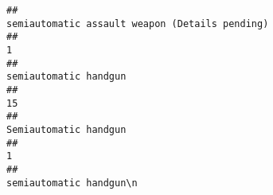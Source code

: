 \documentclass[
]{article}
\begin{document}
\begin{verbatim}
##                                                                                                                                                                                                                                                                                                                                                        semiautomatic assault weapon (Details pending) 
##                                                                                                                                                                                                                                                                                                                                                                                                     1 
##                                                                                                                                                                                                                                                                                                                                                                                 semiautomatic handgun 
##                                                                                                                                                                                                                                                                                                                                                                                                    15 
##                                                                                                                                                                                                                                                                                                                                                                                 Semiautomatic handgun 
##                                                                                                                                                                                                                                                                                                                                                                                                     1 
##                                                                                                                                                                                                                                                                                                                                                                               semiautomatic handgun\n 

\end{verbatim}
\end{document}
